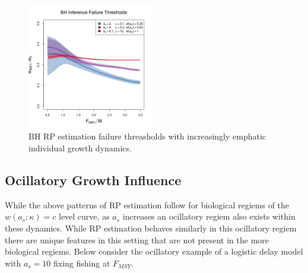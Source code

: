 \begin{figure}
\vspace{-0.75cm}
\includegraphics[width=0.49\textwidth]{../ddBias/metaLowerZetaLinesDDFlatT45N150A0-1AS2K0.1N84Edge.png}
\vspace{-0.95cm}
\caption{BH RP estimation failure threasholds with increasingly emphatic individual growth dynamics.
}\label{breaks}
\end{figure}


%
\clearpage
\subsection{Ocillatory Growth Influence\label{ocillation}}

%
While the above patterns of RP estimation follow for biological regiems 
of the $w(a_s; \kappa)=c$ level curve, as $a_s$ increases an ocillatory 
regiem also exists within these dynamics. While RP estimation behaves 
similarly in this ocillatory regiem there are unique features in this 
setting that are not present in the more biological regiems. Below 
consider the ocillatory example of a logistic delay model with $a_s=10$ fixing 
fishing at $F_{MSY}$. 

